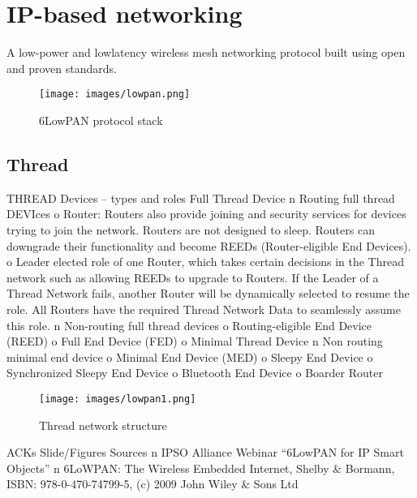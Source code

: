 \section{IP-based networking}

A low-power and lowlatency wireless mesh
networking protocol built
using open and proven
standards.
\begin{figure}[H]
    \centering
    \texttt{[image: images/lowpan.png]}
    \caption{6LowPAN protocol stack}
\end{figure}

\subsection{Thread}
THREAD Devices – types and roles
Full Thread Device
n Routing full thread DEVIces
o Router: Routers also provide joining and security services for devices trying to join
the network. Routers are not designed to sleep. Routers can downgrade their
functionality and become REEDs (Router-eligible End Devices).
o Leader elected role of one Router, which takes certain decisions in the Thread
network such as allowing REEDs to upgrade to Routers. If the Leader of a Thread
Network fails, another Router will be dynamically selected to resume the role. All
Routers have the required Thread Network Data to seamlessly assume this role.
n Non-routing full thread devices
o Routing-eligible End Device (REED)
o Full End Device (FED)
o Minimal Thread Device
n Non routing minimal end device
o Minimal End Device (MED)
o Sleepy End Device
o Synchronized Sleepy End Device
o Bluetooth End Device
o Boarder Router
\begin{figure}[H]
    \centering
    \texttt{[image: images/lowpan1.png]}
    \caption{Thread network structure}
\end{figure}
ACKs 
Slide/Figures Sources
n IPSO Alliance Webinar “6LowPAN for IP Smart
Objects”
n 6LoWPAN: The Wireless Embedded Internet,
Shelby & Bormann, ISBN: 978-0-470-74799-5,
(c) 2009 John Wiley & Sons Ltd

